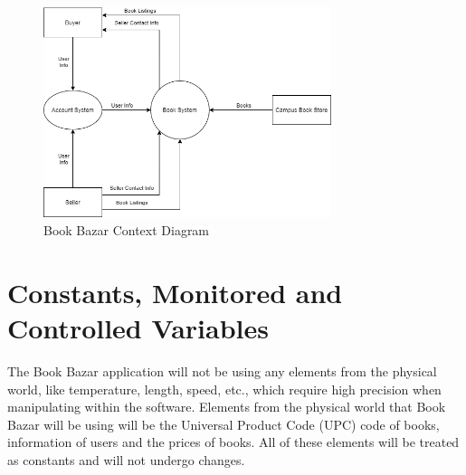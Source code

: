 \documentclass[fullpage]{article}
\begin{document}
\begin{figure}[h!]
    \centering
     \includegraphics[width=0.75\textwidth]{a.png}
    \caption{Book Bazar Context Diagram}
    \label{ContextDiagram}
\end{figure}

\section{Constants, Monitored and Controlled Variables}
The Book Bazar application will not be using any elements from the physical world, like temperature, length, speed, etc., which require high precision when manipulating within the software. Elements from the physical world that Book Bazar will be using will be the Universal Product Code (UPC) code of books, information of users and the prices of books. All of these elements will be treated as constants and will not undergo changes.

\newpage
\end{document}
